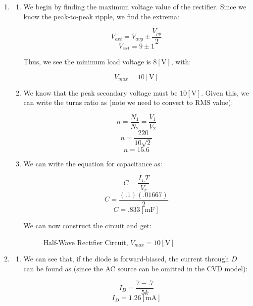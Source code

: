\begin{enumerate}
\begin{enumerate}
    \end{enumerate}

  \item

    \begin{enumerate}

      \item We begin by finding the maximum voltage value of the rectifier. Since we know the peak-to-peak ripple, we find the extrema:

        $$V_{ext}=V_{avg}\pm\frac{V_{pp}}{2}$$
        $$V_{ext}=9\pm 1$$

        Thus, we see the minimum load voltage is $8[\si{\volt}]$, with:

        $$\boxed{V_{max}=10[\si{\volt}]}$$

      \item 

        We know that the peak secondary voltage must be $10[\si{\volt}]$. Given this, we can write the turns ratio as (note we need to convert to RMS value):

        $$n=\frac{N_1}{N_2}=\frac{V_1}{V_2}$$
        $$n=\frac{220}{10\sqrt{2}}$$
        $$\boxed{n=15.6}$$

      \item 

        We can write the equation for capacitance as:

        $$C=\frac{I_LT}{V_r}$$
        $$C=\frac{(.1)(.01667)}{2}$$
        $$\boxed{C=.833[\si{\milli\farad}]}$$

        We can now construct the circuit and get:
        
        \begin{figure}[H]
          \centering
          
          \caption{Half-Wave Rectifier Circuit, $V_{max}=10[\si{\volt}]$}
          \label{fig:9}
        \end{figure}

    \end{enumerate}

  \item

    \begin{enumerate}

      \item We can see that, if the diode is forward-biased, the current through $D$ can be found as (since the AC source can be omitted in the CVD model):

        $$I_D=\frac{7-.7}{5k}$$
        $$\boxed{I_D=1.26[\si{\milli\ampere}]}$$


\end{enumerate}
\end{enumerate}
